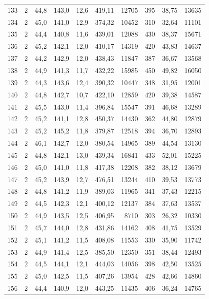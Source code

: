 \documentclass[11pt,a4paper]{article}
\begin{document}
{\begin{longtable}{r c r r r r r r r r}
133 & 2 & 44,8 & 143,0 & 12,6 & 419,11 & 12705 & 395 & 38,75 & 13635 \\
134 & 2 & 45,0 & 141,0 & 12,9 & 374,32 & 10452 & 310 & 32,64 & 11101 \\
135 & 2 & 44,4 & 140,8 & 11,6 & 439,01 & 12088 & 430 & 38,37 & 15671 \\
136 & 2 & 45,2 & 142,1 & 12,0 & 410,17 & 14319 & 420 & 43,83 & 14637 \\
137 & 2 & 44,2 & 142,9 & 12,0 & 438,43 & 11847 & 387 & 36,67 & 13568 \\
138 & 2 & 44,9 & 141,3 & 11,7 & 432,22 & 15985 & 450 & 49,82 & 16050 \\
139 & 2 & 44,3 & 143,6 & 12,4 & 390,32 & 10447 & 348 & 31,95 & 12001 \\
140 & 2 & 44,8 & 142,7 & 10,7 & 422,10 & 12859 & 420 & 39,38 & 14587 \\
141 & 2 & 45,5 & 143,0 & 11,4 & 396,84 & 15547 & 391 & 46,68 & 13289 \\
142 & 2 & 45,2 & 141,1 & 12,8 & 450,37 & 14430 & 362 & 44,80 & 12879 \\
143 & 2 & 45,2 & 145,2 & 11,8 & 379,87 & 12518 & 394 & 36,70 & 12893 \\
144 & 2 & 46,1 & 142,7 & 12,0 & 380,54 & 14965 & 389 & 44,54 & 13130 \\
145 & 2 & 44,8 & 142,1 & 13,0 & 439,34 & 16841 & 433 & 52,01 & 15225 \\
146 & 2 & 45,0 & 141,0 & 11,8 & 417,38 & 12208 & 382 & 38,12 & 13679 \\
147 & 2 & 45,2 & 143,9 & 12,7 & 476,51 & 13244 & 410 & 39,53 & 13773 \\
148 & 2 & 44,8 & 141,2 & 11,9 & 389,03 & 11965 & 341 & 37,43 & 12215 \\
149 & 2 & 44,5 & 142,3 & 12,1 & 400,12 & 12137 & 384 & 37,63 & 13537 \\
150 & 2 & 44,9 & 143,5 & 12,5 & 406,95 & 8710 & 303 & 26,32 & 10330 \\
151 & 2 & 45,7 & 144,0 & 12,8 & 431,86 & 14162 & 408 & 41,75 & 13529 \\
152 & 2 & 45,1 & 141,2 & 11,5 & 408,08 & 11553 & 330 & 35,90 & 11742 \\
153 & 2 & 44,9 & 141,4 & 12,5 & 385,50 & 12350 & 351 & 38,44 & 12493 \\
154 & 2 & 44,5 & 144,1 & 12,1 & 444,03 & 14056 & 398 & 42,50 & 13525 \\
155 & 2 & 45,0 & 142,5 & 11,5 & 407,26 & 13954 & 428 & 42,66 & 14860 \\
156 & 2 & 44,4 & 140,9 & 12,0 & 443,25 & 11435 & 406 & 36,24 & 14765 \\

\end{longtable}}
\end{document}
